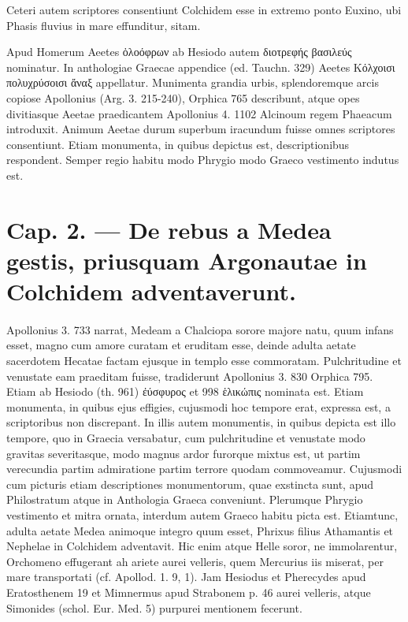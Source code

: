 \documentclass[landscape, a4paper, 11pt, oneside, polutonikogreek, german]{article}
\begin{document}
Ceteri autem scriptores consentiunt Colchidem esse in extremo ponto Euxino, ubi Phasis fluvius in mare effunditur, sitam.

Apud Homerum Aeetes ὀλοόφρων ab Hesiodo autem διοτρεφής βασιλεύς nominatur. In anthologiae Graecae appendice (ed. Tauchn. 329) Aeetes Κόλχοισι πολυχρύσοισι ἄναξ appellatur. Munimenta grandia urbis, splendoremque arcis copiose Apollonius (Arg. 3. 215-240), Orphica 765 describunt, atque opes divitiasque Aeetae praedicantem Apollonius 4. 1102 Alcinoum regem Phaeacum introduxit. Animum Aeetae durum superbum iracundum fuisse omnes scriptores consentiunt. Etiam monumenta, in quibus depictus est, descriptionibus respondent. Semper regio habitu modo Phrygio modo Graeco vestimento indutus est.
\clearpage
\section{Cap. 2. --- De rebus a Medea gestis, priusquam Argonautae in Colchidem adventaverunt.}
\paragraph{}
Apollonius 3. 733 narrat, Medeam a Chalciopa sorore majore natu, quum infans esset, magno cum amore curatam et eruditam esse, deinde adulta aetate sacerdotem Hecatae factam ejusque in templo esse commoratam. Pulchritudine et venustate eam praeditam fuisse, tradiderunt Apollonius 3. 830 Orphica 795. Etiam ab Hesiodo (th. 961) ἐύσφυρος et 998 ἑλικώπις nominata est. Etiam monumenta, in quibus ejus effigies, cujusmodi hoc tempore erat, expressa est, a scriptoribus non discrepant. In illis autem monumentis, in quibus depicta est illo tempore, quo in Graecia versabatur, cum pulchritudine et venustate modo gravitas severitasque, modo magnus ardor furorque mixtus est, ut partim verecundia partim admiratione partim terrore quodam commoveamur. Cujusmodi cum picturis etiam descriptiones monumentorum, quae exstincta sunt, apud Philostratum atque in Anthologia Graeca conveniunt. Plerumque Phrygio vestimento et mitra ornata, interdum autem Graeco habitu picta est. Etiamtunc, adulta aetate Medea animoque integro quum esset, Phrixus filius Athamantis et Nephelae in Colchidem adventavit. Hic enim atque Helle soror, ne immolarentur, Orchomeno effugerant ah ariete aurei velleris, quem Mercurius iis miserat, per mare transportati (cf. Apollod. 1. 9, 1). Jam Hesiodus et Pherecydes apud Eratosthenem 19 et Mimnermus apud Strabonem p. 46 aurei velleris, atque Simonides (schol. Eur. Med. 5) purpurei mentionem fecerunt.
\end{document}
